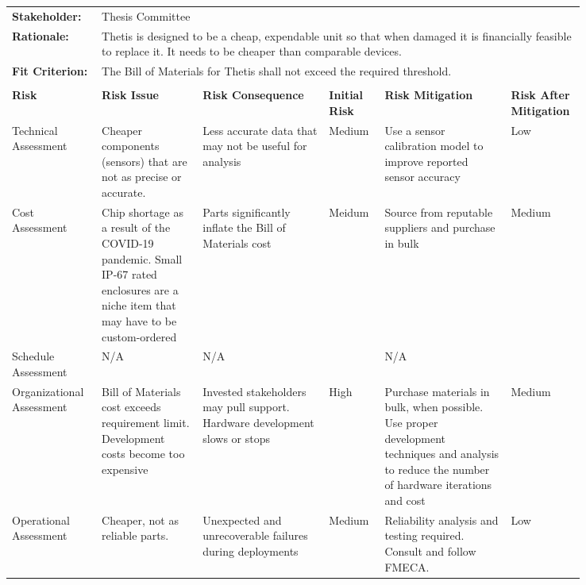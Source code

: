 \begin{landscape}
{\begin{longtable}{| p{0.12\linewidth} | p{0.16\linewidth} |  p{0.20\linewidth} | p{0.08\linewidth} | p{0.20\linewidth} | p{0.08\linewidth} |}
	\hline
	\rowcolor[gray]{0.8}
	\multicolumn{6}{|c|}{ } \\
	\hline
	\textbf{Stakeholder:} & \multicolumn{5}{|l|}{Thesis Committee} \\
	\hline
	\textbf{Rationale:} & \multicolumn{5}{|p{0.8\linewidth}|}{Thetis is designed to be a cheap, expendable unit so that when damaged it is financially feasible to replace it. It needs to be cheaper than comparable devices.} \\
	\hline
	\textbf{Fit Criterion:} & \multicolumn{5}{|p{0.8\linewidth}|}{The Bill of Materials for Thetis shall not exceed the required threshold.} \\
	\hline
	\rowcolor[gray]{0.8}
	\multicolumn{6}{|c|}{ } \\
	\hline
	\textbf{Risk} & \textbf{Risk Issue} & \textbf{Risk Consequence} & \textbf{Initial Risk} & \textbf{Risk Mitigation} & \textbf{Risk \newline After \newline Mitigation} \\
	\hline
	Technical \newline Assessment & Cheaper components (sensors) that are not as precise or accurate. & Less accurate data that may not be useful for analysis & \cellcolor{yellow} Medium & Use a sensor calibration model to improve reported sensor accuracy & \cellcolor{green} Low \\
	\hline
	Cost \newline Assessment & Chip shortage as a result of the COVID-19 pandemic. \newline Small IP-67 rated enclosures are a niche item that may have to be custom-ordered & Parts significantly inflate the Bill of Materials cost & \cellcolor{yellow} Meidum & Source from reputable suppliers and purchase in bulk & \cellcolor{yellow} Medium \\
	\hline
	Schedule \newline Assessment & N/A & N/A & \cellcolor[gray]{0.8} & N/A & \cellcolor[gray]{0.8} \\
	\hline
	Organizational \newline Assessment & Bill of Materials cost exceeds requirement limit. \newline Development costs become too expensive & Invested stakeholders may pull support. \newline Hardware development slows or stops & \cellcolor{red} High & Purchase materials in bulk, when possible. \newline Use proper development techniques and analysis to reduce the number of hardware iterations and cost  & \cellcolor{yellow} Medium \\
	\hline
	Operational \newline Assessment & Cheaper, not as reliable parts. & Unexpected and unrecoverable failures during deployments & \cellcolor{yellow} Medium & Reliability analysis and testing required. \newline Consult and follow FMECA. & \cellcolor{green} Low
	\label{tab:sr04_feasibility}
\end{longtable}
}
\newpage



\end{landscape}
